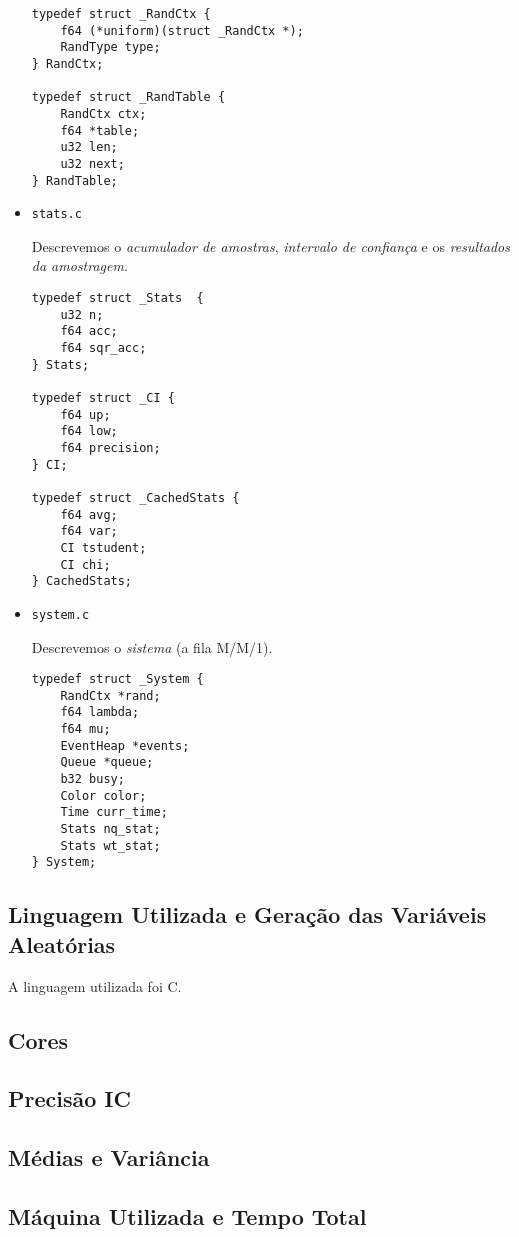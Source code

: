 \documentclass[a4paper]{article}
\newcommand{\arq}{\texttt}
\begin{document}
\begin{itemize}
\begin{verbatim}
typedef struct _RandCtx {
    f64 (*uniform)(struct _RandCtx *);
    RandType type;
} RandCtx;

typedef struct _RandTable {
    RandCtx ctx;
    f64 *table;
    u32 len;
    u32 next;
} RandTable;
        \end{verbatim}
    \item \arq{stats.c} \par
        Descrevemos o \emph{acumulador de amostras},
        \emph{intervalo de confiança} e
        os \emph{resultados da amostragem}.
        \begin{verbatim}
typedef struct _Stats  {
    u32 n;
    f64 acc;
    f64 sqr_acc;
} Stats;

typedef struct _CI {
    f64 up;
    f64 low;
    f64 precision;
} CI;

typedef struct _CachedStats {
    f64 avg;
    f64 var;
    CI tstudent;
    CI chi;
} CachedStats;
        \end{verbatim}
    \item \arq{system.c} \par
        Descrevemos o \emph{sistema} (a fila M/M/1).
        \begin{verbatim}
typedef struct _System {
    RandCtx *rand;
    f64 lambda;
    f64 mu;
    EventHeap *events;
    Queue *queue;
    b32 busy;
    Color color;
    Time curr_time;
    Stats nq_stat;
    Stats wt_stat;
} System;
        \end{verbatim}
\end{itemize}

\subsection{Linguagem Utilizada e Geração das Variáveis Aleatórias}
A linguagem utilizada foi C.
\subsection{Cores}
\subsection{Precisão IC}
\subsection{Médias e Variância}
\subsection{Máquina Utilizada e Tempo Total}
\end{document}
